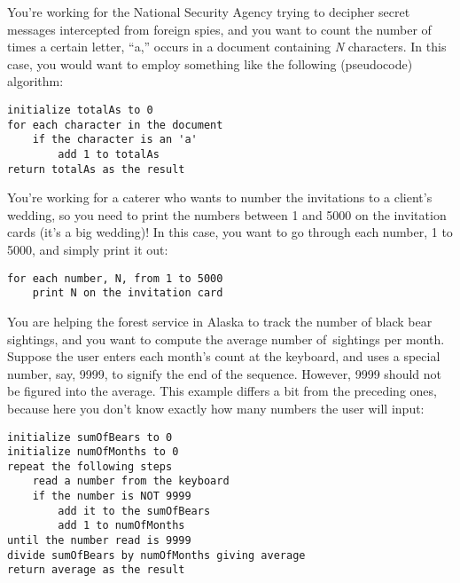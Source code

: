 \begin{BL}
\item  You're working for the National Security Agency trying
to decipher secret messages intercepted from foreign spies, and you
want to count the number of times a certain letter, ``a,'' occurs in
a document containing {\it N} characters.  In this case, you would want to
employ something like the following (pseudocode) algorithm:


\begin{jjjlisting}
\begin{lstlisting}
initialize totalAs to 0
for each character in the document
    if the character is an 'a'
        add 1 to totalAs
return totalAs as the result
\end{lstlisting}
\end{jjjlisting}

\item You're working for a caterer who wants to number the invitations
to a client's wedding, so you need to print the numbers between 1 and
5000 on the invitation cards (it's a big wedding)! In this case, you
want to go through each number, 1 to 5000, and simply print it out:

\begin{jjjlisting}
\begin{lstlisting}
for each number, N, from 1 to 5000
    print N on the invitation card
\end{lstlisting}
\end{jjjlisting}

\item  You are helping the forest service in Alaska to track  the
number of black bear sightings, and you want to compute the average
number of~sightings per month.   Suppose the user enters each month's
count at the keyboard, and uses a special number, say, 9999, to signify
the end of the sequence. However, 9999 should not be figured into the average.
This example differs a bit from the preceding ones, because here you
don't know exactly how many numbers the user will input:

\begin{jjjlisting}
\begin{lstlisting}
initialize sumOfBears to 0
initialize numOfMonths to 0
repeat the following steps
    read a number from the keyboard
    if the number is NOT 9999
        add it to the sumOfBears
        add 1 to numOfMonths
until the number read is 9999
divide sumOfBears by numOfMonths giving average
return average as the result
\end{lstlisting}
\end{jjjlisting}


\end{BL}
